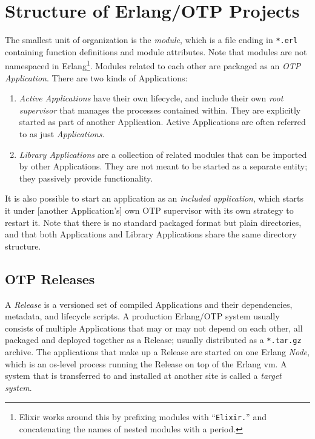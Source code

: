 \section{Structure of Erlang/OTP Projects}

The smallest unit of organization is the \emph{module}, which is a file ending in \lstinline|*.erl| containing function definitions and module attributes. Note that modules are not namespaced in Erlang\footnote{Elixir works around this by prefixing modules with ``\lstinline|Elixir.|'' and concatenating the names of nested modules with a period.}. Modules related to each other are packaged as an \emph{OTP Application}. There are two kinds of Applications:

\begin{enumerate}
  \item \emph{Active Applications} have their own lifecycle, and include their own \emph{root supervisor} that manages the processes contained within. They are explicitly started as part of another Application. Active Applications are often referred to as just \emph{Applications}.\cite{logan:otp}

  \item \emph{Library Applications} are a collection of related modules that can be imported by other Applications. They are not meant to be started as a separate entity; they passively provide functionality.
\end{enumerate}


It is also possible to start an application as an \emph{included application}, which starts it under [another Application's] own OTP supervisor with its own strategy to restart it.\cite{ferd:anger} Note that there is no standard packaged format but plain directories, and that both Applications and Library Applications share the same directory structure.


\subsection{OTP Releases}

A \emph{Release} is a versioned set of compiled Applications and their dependencies, metadata, and lifecycle scripts. A production Erlang/OTP system usually consists of multiple Applications that may or may not depend on each other, all packaged and deployed together as a Release; usually distributed as a \lstinline|*.tar.gz| archive. The applications that make up a Release are started on one Erlang \emph{Node}, which is an \acrshort{os}-level process running the Release on top of the Erlang \acrshort{vm}. A system that is transferred to and installed at another site is called a \emph{target system}.\cite[347]{d]oc:otp}

